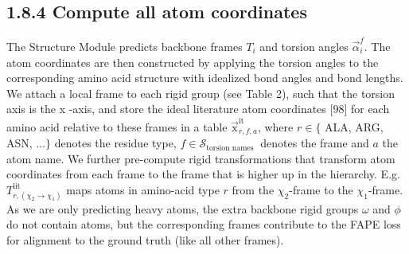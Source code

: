 \documentclass[10pt]{article}
\begin{document}
\subsection*{1.8.4 Compute all atom coordinates}
The Structure Module predicts backbone frames $T_{i}$ and torsion angles $\vec{\alpha}_{i}^{f}$. The atom coordinates are then constructed by applying the torsion angles to the corresponding amino acid structure with idealized bond angles and bond lengths. We attach a local frame to each rigid group (see Table 2), such that the torsion axis is the x -axis, and store the ideal literature atom coordinates [98] for each amino acid relative to these frames in a table $\overrightarrow{\mathrm{x}}_{r, f, a}^{\mathrm{it}}$, where $r \in\{$ ALA, ARG, ASN, $\ldots\}$ denotes the residue type, $f \in \mathcal{S}_{\text {torsion names }}$ denotes the frame and $a$ the atom name. We further pre-compute rigid transformations that transform atom coordinates from each frame to the frame that is higher up in the hierarchy. E.g. $T_{r,\left(\chi_{2} \rightarrow \chi_{1}\right)}^{\text {lit }}$ maps atoms in amino-acid type $r$ from the $\chi_{2}$-frame to the $\chi_{1}$-frame. As we are only predicting heavy atoms, the extra backbone rigid groups $\omega$ and $\phi$ do not contain atoms, but the corresponding frames contribute to the FAPE loss for alignment to the ground truth (like all other frames).
\end{document}
